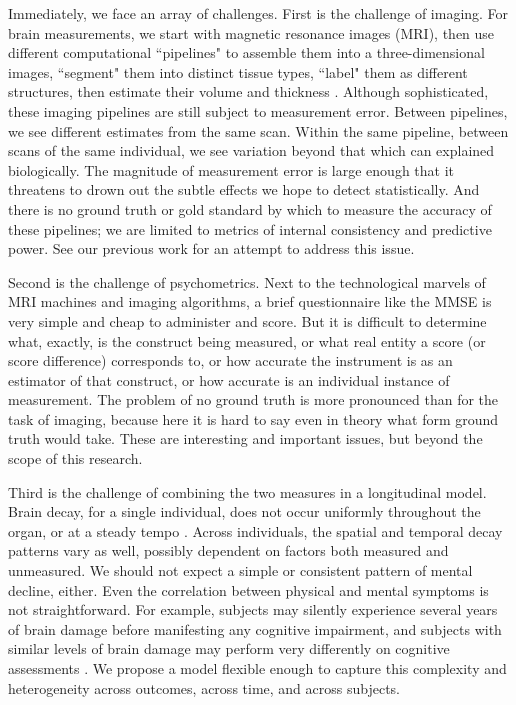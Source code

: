 \documentclass[12pt]{article}
\begin{document}
Immediately, we face an array of challenges. First is the challenge of imaging. For brain measurements, we start with magnetic resonance images (MRI), then use different computational ``pipelines" to assemble them into a three-dimensional images, ``segment" them into distinct tissue types, ``label" them as different structures, then estimate their volume and thickness \citep{tustison2021antsx}. Although sophisticated, these imaging pipelines are still subject to measurement error. Between pipelines, we see different estimates from the same scan. Within the same pipeline, between scans of the same individual, we see variation beyond that which can explained biologically. The magnitude of measurement error is large enough that it threatens to drown out the subtle effects we hope to detect statistically. And there is no ground truth or gold standard by which to measure the accuracy of these pipelines; we are limited to metrics of internal consistency and predictive power. See our previous work \citep{birchfield2022synthesizing} for an attempt to address this issue.

Second is the challenge of psychometrics. Next to the technological marvels of MRI machines and imaging algorithms, a brief questionnaire like the MMSE is very simple and cheap to administer and score. But it is difficult to determine what, exactly, is the construct being measured, or what real entity a score (or score difference) corresponds to, or how accurate the instrument is as an estimator of that construct, or how accurate is an individual instance of measurement. The problem of no ground truth is more pronounced than for the task of imaging, because here it is hard to say even in theory what form ground truth would take. These are interesting and important issues, but beyond the scope of this research. 

Third is the challenge of combining the two measures in a longitudinal model. Brain decay, for a single individual, does not occur uniformly throughout the organ, or at a steady tempo \citep{holbrook2020anterolateral}. Across individuals, the spatial and temporal decay patterns vary as well, possibly dependent on factors both measured and unmeasured. We should not expect a simple or consistent pattern of mental decline, either. Even the correlation between physical and mental symptoms is not straightforward. For example, subjects may silently experience several years of brain damage before manifesting any cognitive impairment, and subjects with similar levels of brain damage may perform very differently on cognitive assessments \citep{rodgers2002alzheimer}. We propose a model flexible enough to capture this complexity and heterogeneity across outcomes, across time, and across subjects. 
\end{document}
